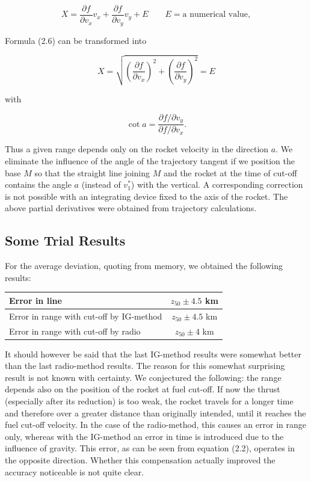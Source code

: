 \documentclass[12pt, a4paper]{article}
\begin{document}
\begin{enumerate}
\begin{equation}
  X=\frac{\partial f}{\partial v_{x}}v_{x}+\frac{\partial f}{\partial v_{y}}v_{y}+E\quad\quad{E=\text{a numerical value}},
\end{equation}

Formula (2.6) can be transformed into

\begin{equation}
  X=\sqrt{\left(\frac{\partial f}{\partial v_{x}}\right)^{2}+\left(\frac{\partial f}{\partial v_{y}}\right)^{2}}=E
\end{equation}

with

\begin{equation}
  \cot{a} = \frac{\partial f/\partial v_{y}}{\partial f/\partial v_{x}}.
\end{equation}

Thus a given range depends only on the rocket velocity in the direction $a$. We eliminate the influence of the angle of the trajectory tangent if we position the base $M$ so that the straight line joining $M$ and the rocket at the time of cut-off contains the angle $a$ (instead of $v_{1}^{*}$) with the vertical. A corresponding correction is not possible with an integrating device fixed to the axis of the rocket. The above partial derivatives were obtained from trajectory calculations.
\end{enumerate}

\subsection{Some Trial Results}

For the average deviation, quoting from memory, we obtained the following
results:

\begin{center}
\begin{tabular}{|l|c|}
  \hline
  Error in line & $z_{50} \pm 4.5$ km \\\hline
  Error in range with cut-off by IG-method & $z_{50} \pm 4.5$ km \\\hline
  Error in range with cut-off by radio & $z_{50} \pm 4$ km \\\hline
\end{tabular}
\end{center}

It should however be said that the last IG-method results were somewhat better than the last radio-method results. The reason for this somewhat surprising result is not known with certainty. We conjectured the following: the range depends also on the position of the rocket at fuel cut-off. If now the thrust (especially after its reduction) is too weak, the rocket travels for a longer time and therefore over a greater distance than originally intended, until it reaches the fuel cut-off velocity. In the case of the radio-method, this causes an error in range only, whereas with the IG-method an error in time is introduced due to the influence of gravity. This error, as can be seen from equation (2.2), operates in the opposite direction. Whether this compensation actually improved the accuracy noticeable is not quite clear.
\end{document}
